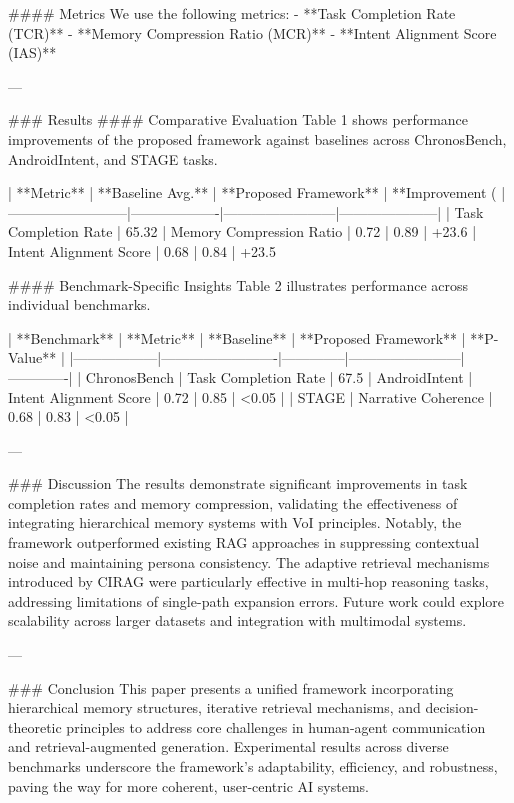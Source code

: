 #### Metrics  
We use the following metrics:  
- **Task Completion Rate (TCR)**  
- **Memory Compression Ratio (MCR)**  
- **Intent Alignment Score (IAS)**  

---

### Results  
#### Comparative Evaluation  
Table 1 shows performance improvements of the proposed framework against baselines across ChronosBench, AndroidIntent, and STAGE tasks.  

| **Metric**               | **Baseline Avg.** | **Proposed Framework** | **Improvement (%
|--------------------------|-------------------|------------------------|---------------------|
| Task Completion Rate     | 65.32%
| Memory Compression Ratio | 0.72              | 0.89                   | +23.6%
| Intent Alignment Score   | 0.68              | 0.84                   | +23.5%

#### Benchmark-Specific Insights  
Table 2 illustrates performance across individual benchmarks.  

| **Benchmark**   | **Metric**              | **Baseline** | **Proposed Framework** | **P-Value** |
|------------------|-------------------------|--------------|------------------------|-------------|
| ChronosBench    | Task Completion Rate    | 67.5%
| AndroidIntent   | Intent Alignment Score  | 0.72         | 0.85                   | <0.05       |
| STAGE           | Narrative Coherence     | 0.68         | 0.83                   | <0.05       |

---

### Discussion  
The results demonstrate significant improvements in task completion rates and memory compression, validating the effectiveness of integrating hierarchical memory systems with VoI principles. Notably, the framework outperformed existing RAG approaches in suppressing contextual noise and maintaining persona consistency. The adaptive retrieval mechanisms introduced by CIRAG were particularly effective in multi-hop reasoning tasks, addressing limitations of single-path expansion errors. Future work could explore scalability across larger datasets and integration with multimodal systems.

---

### Conclusion  
This paper presents a unified framework incorporating hierarchical memory structures, iterative retrieval mechanisms, and decision-theoretic principles to address core challenges in human-agent communication and retrieval-augmented generation. Experimental results across diverse benchmarks underscore the framework's adaptability, efficiency, and robustness, paving the way for more coherent, user-centric AI systems.

